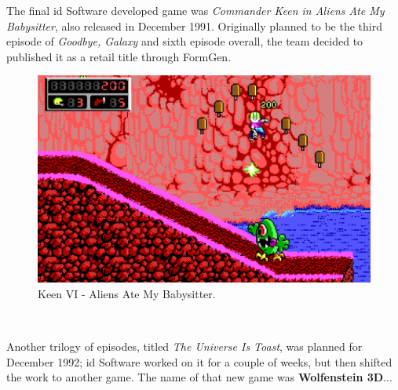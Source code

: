 \documentclass[book.tex]{subfiles}
\begin{document}
\par
The final id Software developed game was \textit{Commander Keen in Aliens Ate My Babysitter}, also released in December 1991. Originally planned to be the third episode of \textit{Goodbye, Galaxy} and sixth episode overall, the team decided to published it as a retail title through FormGen.\\

\begin{figure}[H]
  \centering
  \includegraphics[width=.95\textwidth]{screenshots_300dpi/keen3_1.png}
  \caption{Keen VI - Aliens Ate My Babysitter.}
\label{fig:keen_1}
\end{figure}


\\

\par
Another trilogy of episodes, titled \textit{The Universe Is Toast}, was planned for December 1992; id Software worked on it for a couple of weeks, but then shifted the work to another game. The name of that new game was \textbf{Wolfenstein 3D}...
\end{document}

